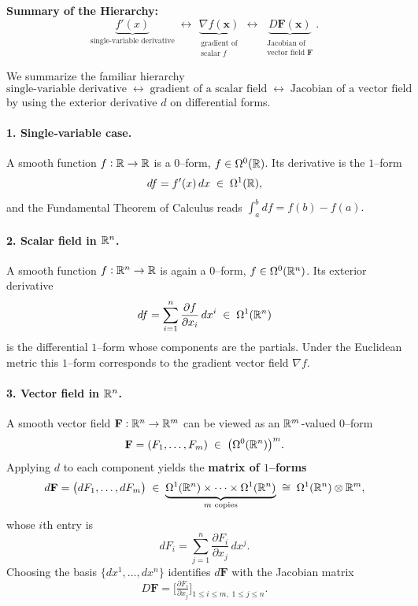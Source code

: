 \documentclass[11pt,openany]{article}
\renewcommand{\emph}[1]{\textbf{#1}}
\begin{document}
\bigskip

\noindent\emph{Summary of the Hierarchy:}
\[
\underbrace{f'(x)}_{\text{single‐variable derivative}}
\;\longleftrightarrow\;
\underbrace{\nabla f(\mathbf x)}_{\substack{\text{gradient of}\\\text{scalar }f}}
\;\longleftrightarrow\;
\underbrace{D\mathbf F(\mathbf x)}_{\substack{\text{Jacobian of}\\\text{vector field }\mathbf F}}.
\]

We summarize the familiar hierarchy
\[
\text{single‐variable derivative}
\;\longleftrightarrow\;
\text{gradient of a scalar field}
\;\longleftrightarrow\;
\text{Jacobian of a vector field}
\]
by using the exterior derivative \(d\) on differential forms.

\bigskip

\paragraph{1. Single‐variable case.}
A smooth function \(f:\mathbb{R}\to\mathbb{R}\) is a \(0\)–form, \(f\in\Omega^0(\mathbb{R})\).  Its derivative is the \(1\)–form
\[
df 
= f'(x)\,dx
\;\in\;\Omega^1(\mathbb{R}),
\]
and the Fundamental Theorem of Calculus reads
\(\displaystyle\int_a^b df = f(b)-f(a).\)

\medskip

\paragraph{2. Scalar field in \(\mathbb{R}^n\).}
A smooth function \(f:\mathbb{R}^n\to\mathbb{R}\) is again a \(0\)–form, \(f\in\Omega^0(\mathbb{R}^n)\).  Its exterior derivative
\[
df
=\sum_{i=1}^n \frac{\partial f}{\partial x_i}\,dx^i
\;\in\;\Omega^1(\mathbb{R}^n)
\]
is the differential \(1\)–form whose components are the partials.  Under the Euclidean metric this \(1\)–form corresponds to the gradient vector field \(\nabla f\).

\medskip

\paragraph{3. Vector field in \(\mathbb{R}^n\).}
A smooth vector field \(\mathbf F:\mathbb{R}^n\to\mathbb{R}^m\) can be viewed as an \(\mathbb{R}^m\)‐valued \(0\)–form
\[
\mathbf F
=(F_1,\dots,F_m)
\;\in\;\bigl(\Omega^0(\mathbb{R}^n)\bigr)^m.
\]
Applying \(d\) to each component yields the \emph{matrix of \(1\)–forms}
\[
d\mathbf F
=
\bigl(dF_1,\dots,dF_m\bigr)
\;\in\;
\underbrace{\Omega^1(\mathbb{R}^n)\times\cdots\times\Omega^1(\mathbb{R}^n)}_{m\text{ copies}}
\;\cong\;\Omega^1(\mathbb{R}^n)\otimes\mathbb{R}^m,
\]
whose \(i\)th entry is
\[
dF_i
=\sum_{j=1}^n\frac{\partial F_i}{\partial x_j}\,dx^j.
\]
Choosing the basis \(\{dx^1,\dots,dx^n\}\) identifies \(d\mathbf F\) with the Jacobian matrix
\[
D\mathbf F
=\bigl[\tfrac{\partial F_i}{\partial x_j}\bigr]_{1\le i\le m,\;1\le j\le n}.
\]
\end{document}
